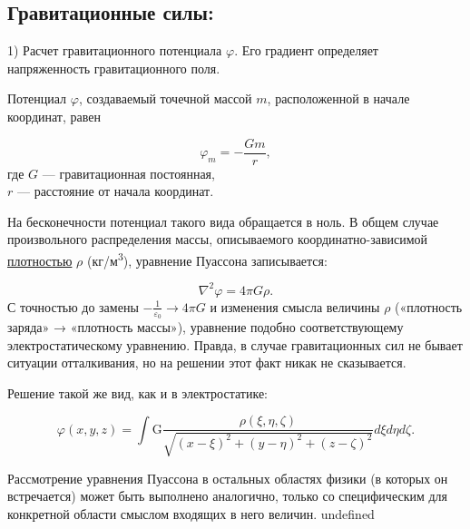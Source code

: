\subsection{ Гравитационные силы: }
1) Расчет гравитационного потенциала  $\varphi$. Его градиент определяет напряженность гравитационного поля.

Потенциал $\varphi$, создаваемый точечной массой $m$, расположенной в начале координат, равен

\begin{equation}
  \varphi_m = -\frac{G m}{r},
\end{equation}
где $G$     — гравитационная постоянная,\\
$r$ — расстояние от начала координат.\\
\par
На бесконечности потенциал такого вида обращается в ноль. В общем случае произвольного распределения массы, описываемого координатно-зависимой \href{https://ru.wikipedia.org/wiki/\%D0\%9F\%D0\%BB\%D0\%BE\%D1\%82\%D0\%BD\%D0\%BE\%D1\%81\%D1\%82\%D1\%8C}{плотностью} $ρ$ (кг/м\textsuperscript{3}), уравнение Пуассона записывается:

\begin{equation}
  \nabla^2 \varphi = 4 \pi G \rho.
\end{equation}
С точностью до замены $-\frac{1}{\varepsilon_0} \rightarrow 4 \pi G$    и изменения смысла величины $\rho$ («плотность заряда»  → «плотность массы»), уравнение подобно соответствующему электростатическому уравнению. Правда, в случае гравитационных сил не бывает ситуации отталкивания, но на решении этот факт никак не сказывается.

Решение такой же вид, как и в электростатике:

\begin{equation}
  \varphi (x,y,z) = \int \text{G} \frac{\rho(\xi,\eta,\zeta)}{\sqrt{(x-\xi)^2+(y-\eta)^2+(z-\zeta)^2}} d\xi d\eta d\zeta.
\end{equation}

\medskip
\medskip
\medskip
\medskip
\medskip
\medskip
\medskip
Рассмотрение уравнения Пуассона в остальных областях физики (в которых он встречается) может быть выполнено аналогично, только со специфическим для конкретной области смыслом входящих в него величин.
undefined